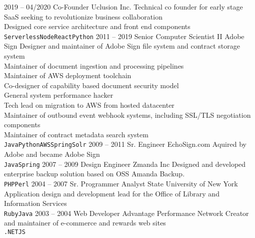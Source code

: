 \documentclass[9pt]{developercv} %
\begin{document}
\begin{entrylist}
	\entry
		{2019 -- 04/2020}
		{Co-Founder}
		{Uclusion Inc.}
	        {Technical co founder for early stage SaaS seeking to revolutionize business collaboration\\
	        Designed core service architecture and front end components\\
		\texttt{Serverless}\slashsep\texttt{Node}\slashsep\texttt{React}\slashsep\texttt{Python}}
	\entry
		{2011 -- 2019}
		{Senior Computer Scientist II}
		{Adobe Sign}
                {Designer and maintainer of Adobe Sign file system and contract storage system\\
                Maintainer of document ingestion and processing pipelines\\
                Maintainer of AWS deployment toolchain\\
                Co-designer of capability based document security model\\
                General system performance hacker\\
                Tech lead on migration to AWS from hosted datacenter\\
                Maintainer of outbound event webhook systems, including SSL/TLS negotiation components\\
                Maintainer of contract metadata search system\\
		\texttt{Java}\slashsep\texttt{Python}\slashsep\texttt{AWS}\slashsep\texttt{Spring}\slashsep\texttt{Solr}}
	\entry
		{2009 -- 2011}
		{Sr. Engineer}
		{EchoSign.com}
                {Aquired by Adobe and became Adobe Sign\\
		\texttt{Java}\slashsep\texttt{Spring}}
	\entry
		{2007 -- 2009}
		{Design Engineer}
		{Zmanda Inc}
                {Designed and developed enterprise backup solution based on OSS Amanda Backup.\\
		\texttt{PHP}\slashsep\texttt{Perl}}
	\entry
		{2004 -- 2007}
		{Sr. Programmer Analyst}
		{State University of New York}
                {Application design and development lead for the Office of Library and Information Services\\
		\texttt{Ruby}\slashsep\texttt{Java}}
	\entry
		{2003 -- 2004}
		{Web Developer}
		{Advantage Performance Network}
                {Creator and maintainer of e-commerce and rewards web sites\\
		\texttt{.NET}\slashsep\texttt{JS}}
\end{entrylist}

\end{document}
